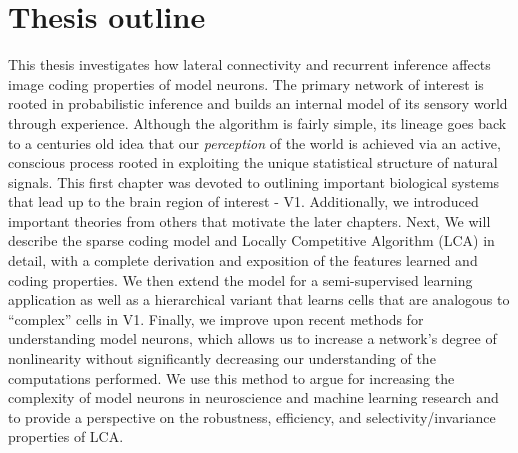 \section{Thesis outline}\label{sec:ch1_outline}
This thesis investigates how lateral connectivity and recurrent inference affects image coding properties of model neurons. The primary network of interest is rooted in probabilistic inference and builds an internal model of its sensory world through experience. Although the algorithm is fairly simple, its lineage goes back to a centuries old idea that our \textit{perception} of the world is achieved via an active, conscious process rooted in exploiting the unique statistical structure of natural signals. This first chapter was devoted to outlining important biological systems that lead up to the brain region of interest - V1. Additionally, we introduced important theories from others that motivate the later chapters. Next, We will describe the sparse coding model and Locally Competitive Algorithm (LCA) in detail, with a complete derivation and exposition of the features learned and coding properties. We then extend the model for a semi-supervised learning application as well as a hierarchical variant that learns cells that are analogous to ``complex'' cells in V1. Finally, we improve upon recent methods for understanding model neurons, which allows us to increase a network's degree of nonlinearity without significantly decreasing our understanding of the computations performed. We use this method to argue for increasing the complexity of model neurons in neuroscience and machine learning research and to provide a perspective on the robustness, efficiency, and selectivity/invariance properties of LCA.